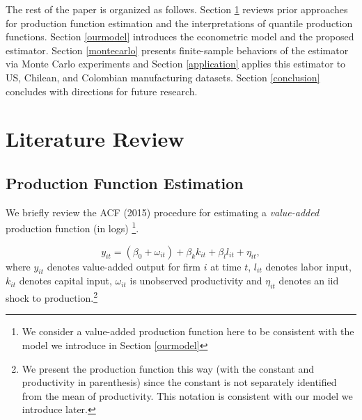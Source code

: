 \documentclass[11pt]{article}
\begin{document}
The rest of the paper is organized as follows. Section \ref{litreview} reviews prior approaches for production function estimation and the interpretations of quantile production functions. Section \ref{ourmodel} introduces the econometric model and the proposed estimator. Section \ref{montecarlo} presents finite-sample behaviors of the estimator via Monte Carlo experiments and Section \ref{application} applies this estimator to US, Chilean, and Colombian manufacturing datasets. Section \ref{conclusion} concludes with directions for future research.

\section{Literature Review} \label{litreview}
\subsection{Production Function Estimation}

We briefly review the ACF (2015) procedure for estimating a \textit{value-added} production function (in logs) \footnote{We consider a value-added production function here to be consistent with the model we introduce in Section \ref{ourmodel}}.

\begin{equation}
y_{it}=(\beta_{0}+\omega_{it})+\beta_{k}k_{it}+\beta_{l}l_{it}+\eta_{it},
\end{equation}
where $y_{it}$ denotes value-added output for firm $i$ at time $t$, $l_{it}$ denotes labor input, $k_{it}$ denotes capital input, $\omega_{it}$ is unobserved productivity and $\eta_{it}$ denotes an iid shock to production.\footnote{We present the production function this way (with the constant and productivity in parenthesis) since the constant is not separately identified from the mean of productivity. This notation is consistent with our model we introduce later.}
\end{document}

